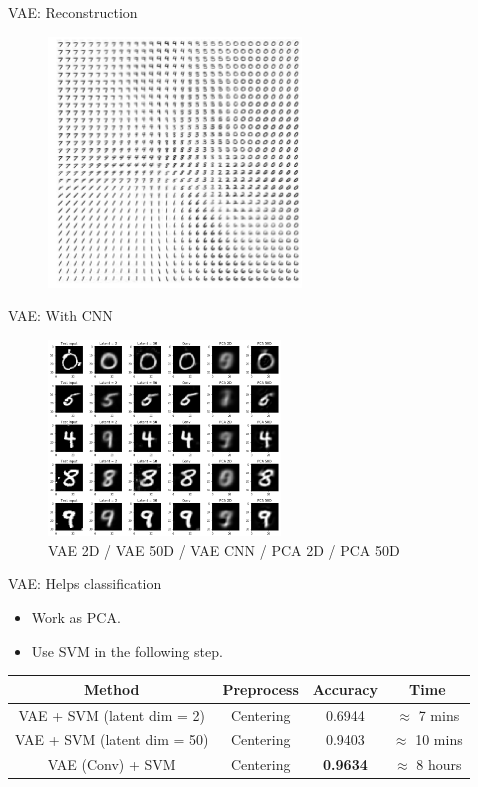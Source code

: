 \documentclass[11pt]{beamer} %
\begin{document}
\begin{frame}{VAE: Reconstruction}
\begin{figure}[htbp]
\centering
\includegraphics[width=0.6\textwidth]{img/reconstr_2d.png}
\end{figure}
\end{frame}


\begin{frame}{VAE: With CNN}
\begin{figure}[htbp]
\centering
\includegraphics[width=0.55\textwidth]{img/reconstr_compare_pca_slides.png}
\caption{VAE 2D / VAE 50D / VAE CNN / PCA 2D / PCA 50D}
\end{figure}
\end{frame}

\begin{frame}{VAE: Helps classification}
\begin{itemize}
    \item Work as PCA.
    \item Use SVM in the following step.
\end{itemize}

\begin{table}[htbp]
    \centering
    \begin{tabular}{cccc}
    \toprule
        Method & Preprocess & Accuracy & Time  \\
    \midrule
        VAE + SVM (latent dim = 2) & Centering & 0.6944 & $\approx$ 7 mins \\
        VAE + SVM (latent dim = 50) & Centering & 0.9403 & $\approx$ 10 mins  \\
        VAE (Conv) + SVM & Centering & \textbf{0.9634} & $\approx$ 8 hours \\
    \bottomrule
    \end{tabular}
\end{table}

\end{frame}
\end{document}
